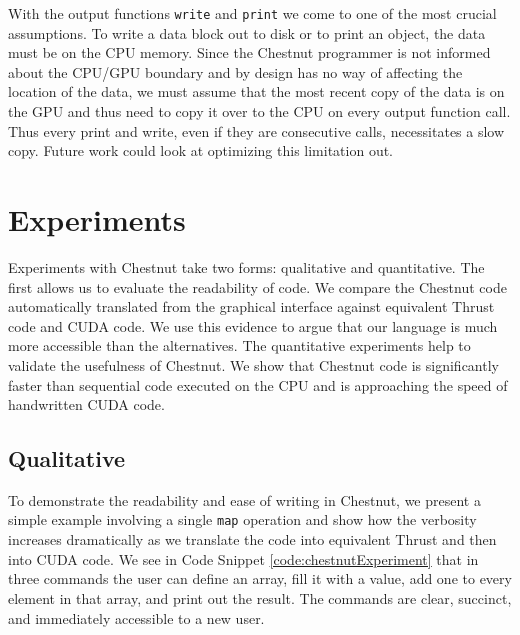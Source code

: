 \documentclass[twocolumn]{article}
\renewcommand{\|}{\origbar} %
\newcommand{\code}[1]{\texttt{#1}}
\begin{document}
With the output functions \code{write} and \code{print} we come to one of the most crucial assumptions. To write a data block out to disk or to print an object, the data must be on the CPU memory. Since the Chestnut programmer is not informed about the CPU/GPU boundary and by design has no way of affecting the location of the data, we must assume that the most recent copy of the data is on the GPU and thus need to copy it over to the CPU on every output function call. Thus every print and write, even if they are consecutive calls, necessitates a slow copy. Future work could look at optimizing this limitation out. 


\section{Experiments}
\label{sec:experiments}


Experiments with Chestnut take two forms: qualitative and quantitative. The first allows us to evaluate the readability of code. We compare the Chestnut code automatically translated from the graphical interface against equivalent Thrust code and CUDA code. We use this evidence to argue that our language is much more accessible than the alternatives. The quantitative experiments help to validate the usefulness of Chestnut. We show that Chestnut code is significantly faster than sequential code executed on the CPU and is approaching the speed of handwritten CUDA code.

\subsection{Qualitative}

To demonstrate the readability and ease of writing in Chestnut, we present a simple example involving a single \code{map} operation and show how the verbosity increases dramatically as we translate the code into equivalent Thrust and then into CUDA code. We see in Code Snippet \ref{code:chestnutExperiment} that in three commands the user can define an array, fill it with a value, add one to every element in that array, and print out the result. The commands are clear, succinct, and immediately accessible to a new user. 
\end{document}
